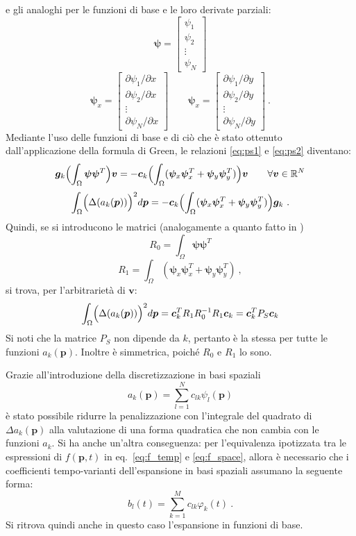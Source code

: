 \documentclass[a4paper,11pt,twoside,openright]{book}							%
\begin{document}
e gli analoghi per le funzioni di base e le loro derivate parziali:
$$
\bm \psi =
\begin{bmatrix}
\psi_{1}  \\
\psi_{2}  \\
\vdots\\
\psi_{N}
\end{bmatrix}
$$
\begin{equation}
\bm \psi_x=  \begin{bmatrix}
\partial \psi_{1}/\partial x \\
\partial \psi_{2}/\partial x  \\
\vdots\\
\partial \psi_{N}/\partial x \end{bmatrix} 
\qquad
\bm \psi_x=  \begin{bmatrix}
\partial \psi_{1}/\partial y  \\
\partial \psi_{2}/\partial y  \\
\vdots\\
\partial \psi_{N}/\partial y\end{bmatrix} \ .
\end{equation}
Mediante l'uso delle funzioni di base e di ciò che è stato ottenuto dall'applicazione della formula di Green, le relazioni \ref{eq:ps1} e \ref{eq:ps2} diventano:
$$
\bm{g}_k \Bigl(\int_\Omega \bm \psi \bm \psi^T \Bigr)\bm{v}=
-\bm{c}_k \Bigl(\int_\Omega (\bm \psi_x \bm \psi_x^T + \bm \psi_y \bm \psi_y^T)\Bigr) \bm{v} \qquad \forall \bm{v} \in \mathbb{R}^N
$$
$$
\int_{\Omega} \Bigl( \Delta(  a_k(\bm p)  ) \Bigr)^2 d \bm p = -\bm{c}_k \Bigl(\int_\Omega (\bm \psi_x \bm \psi_x^T + \bm \psi_y \bm \psi_y^T) \Bigr)\bm{g}_k \ .
$$
Quindi, se si introducono le matrici (analogamente a quanto fatto in \cite{art:sangalli})
$$ R_0 = \int_\Omega \bm \psi \bm \psi^T $$
$$ R_1 = \int_\Omega (\bm \psi_x \bm \psi_x^T + \bm \psi_y \bm \psi_y^T) \ ,$$
si trova, per l'arbitrarietà di $\bm v$:
\begin{equation}
\label{eq:pspace}
\int_{\Omega} \Bigl( \Delta(  a_k(\bm p)  ) \Bigr)^2 d \bm p = \bm{c}_k^T R_1 R_0^{-1} R_1 \bm{c}_k=\bm{c}_k^T P_S \bm{c}_k
\end{equation}
Si noti che la matrice $P_S$ non dipende da $k$, pertanto è la stessa per tutte le funzioni $a_k(\bm{p})$. Inoltre è simmetrica, poiché $R_0$ e $R_1$ lo sono.

Grazie all'introduzione della discretizzazione in basi spaziali
$$
a_k(\bm p)=\sum_{l=1}^N c_{lk}\psi_l(\bm p)
$$
è stato possibile ridurre la penalizzazione con l'integrale del quadrato di $\Delta a_k(\bm p)$
alla valutazione di una forma quadratica che non cambia con le funzioni $a_k$. Si ha anche un'altra conseguenza: per l'equivalenza ipotizzata tra le espressioni di $f(\bm{p},t)$ in eq.~\ref{eq:f_temp} e \ref{eq:f_space}, allora è necessario che i coefficienti tempo-varianti dell'espansione in basi spaziali assumano la seguente forma:
$$
b_l(t)=\sum_{k=1}^M c_{lk}\varphi_k(t) \ .
$$
Si ritrova quindi anche in questo caso l'espansione in funzioni di base.
\end{document}
